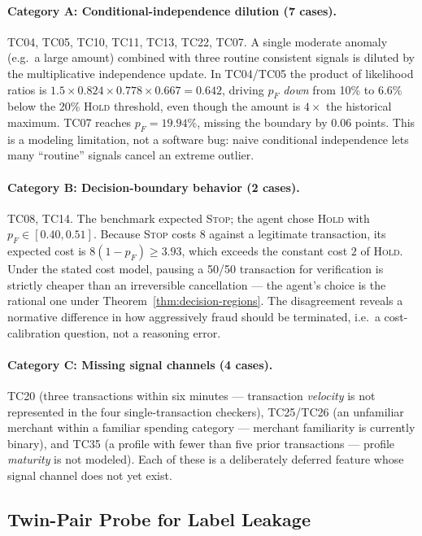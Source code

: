 \documentclass{article}
\begin{document}
\paragraph{Category A: Conditional-independence dilution (7 cases).}
TC04, TC05, TC10, TC11, TC13, TC22, TC07. A single moderate anomaly (e.g.\ a
large amount) combined with three routine consistent signals is diluted by the
multiplicative independence update. In TC04/TC05 the product of likelihood
ratios is $1.5 \times 0.824 \times 0.778 \times 0.667 = 0.642$, driving $p_F$
\emph{down} from 10\% to 6.6\% below the 20\% \textsc{Hold} threshold, even
though the amount is $4\times$ the historical maximum. TC07 reaches
$p_F = 19.94\%$, missing the boundary by 0.06 points. This is a modeling
limitation, not a software bug: naive conditional independence lets many
``routine'' signals cancel an extreme outlier.

\paragraph{Category B: Decision-boundary behavior (2 cases).}
TC08, TC14. The benchmark expected \textsc{Stop}; the agent chose
\textsc{Hold} with $p_F \in [0.40, 0.51]$. Because \textsc{Stop} costs $8$
against a legitimate transaction, its expected cost is $8(1-p_F) \ge 3.93$,
which exceeds the constant cost $2$ of \textsc{Hold}. Under the stated cost
model, pausing a 50/50 transaction for verification is strictly cheaper than
an irreversible cancellation --- the agent's choice is the rational one under
Theorem~\ref{thm:decision-regions}. The disagreement reveals a normative difference in
how aggressively fraud should be terminated, i.e.\ a cost-calibration question,
not a reasoning error.

\paragraph{Category C: Missing signal channels (4 cases).}
TC20 (three transactions within six minutes --- transaction \emph{velocity} is
not represented in the four single-transaction checkers), TC25/TC26 (an
unfamiliar merchant within a familiar spending category --- merchant familiarity
is currently binary), and TC35 (a profile with fewer than five prior
transactions --- profile \emph{maturity} is not modeled). Each of these is a
deliberately deferred feature whose signal channel does not yet exist.

\subsection{Twin-Pair Probe for Label Leakage}
\end{document}
